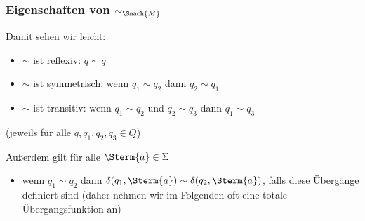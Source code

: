 \documentclass[aspectratio=1610,onlymath]{beamer}
\begin{document}
\begin{frame}\frametitle{Eigenschaften von $\sim_{\Smach{M}}$}

%
\smallskip\pause

Damit sehen wir leicht:
\begin{itemize}
\item $\sim$ ist \alert{reflexiv}: $q\sim q$
\item $\sim$ ist \alert{symmetrisch}: wenn $q_1\sim q_2$ dann $q_2\sim q_1$
\item $\sim$ ist \alert{transitiv}: wenn $q_1\sim q_2$ und $q_2\sim q_3$ dann $q_1\sim q_3$
\end{itemize}
(jeweils für alle $q,q_1,q_2,q_3\in Q$)
\medskip

%
\smallskip\pause

Außerdem gilt für alle $\Sterm{a}\in\Sigma$
\begin{itemize}
\item wenn $q_1\sim q_2$ dann $\delta(q_1,\Sterm{a})\sim\delta(q_2,\Sterm{a})$,
falls diese Übergänge definiert sind {\tiny (daher nehmen wir im Folgenden oft eine totale Übergangsfunktion an)}
\end{itemize}
\smallskip

\smallskip

\end{frame}

\newcommand{\simquot}[1]{#1/_{\!\!{\sim}}}
\end{document}
